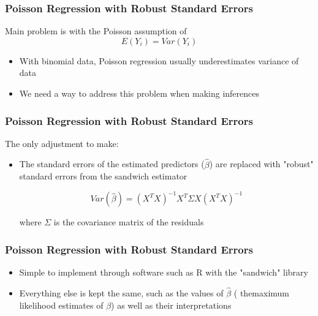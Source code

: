 \documentclass{beamer}
\begin{document}
\begin{frame}[fragile]\frametitle{Poisson Regression with Robust Standard Errors}

	Main problem is with the Poisson assumption of 	
	$$ E(Y_i) = Var(Y_i) $$ 

	\begin{itemize}

		\item With binomial data, Poisson regression usually underestimates variance of data
		
		\item We need a way to address this problem when making inferences

	\end{itemize}
	
\end{frame}



\begin{frame}[fragile]\frametitle{Poisson Regression with Robust Standard Errors}
	
	The only adjustment to make:	
	
	\begin{itemize}
		
		\item The standard errors of the estimated predictors ($\hat{\beta}$) are replaced with "robust" standard errors from the sandwich estimator 
		
		$$ Var(\hat{\beta}) = (X^{T}X)^{-1}X^{T} \Sigma X(X^{T}X)^{-1} $$
		
		where $\Sigma$ is the covariance matrix of the residuals			
		
	\end{itemize}	
	
\end{frame}



\begin{frame}[fragile]\frametitle{Poisson Regression with Robust Standard Errors}
	
	\begin{itemize}
		
		\item Simple to implement through software such as R with the "sandwich" library

		\item Everything else is kept the same, such as the values of $\hat{\beta}$ ( themaximum likelihood estimates of $\beta$) as well as their interpretations

	\end{itemize}
	
\end{frame}
\end{document}

